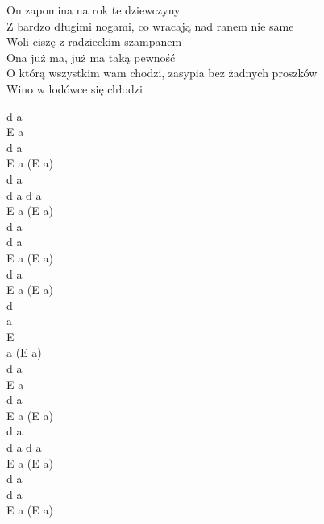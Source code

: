 \documentclass[a5paper, 10pt]{book}
\begin{document}
\begin{minipage}[t]{0.85\textwidth}
\hspace*{1mm} On zapomina na rok te dziewczyny\\
\hspace*{1mm} Z bardzo długimi nogami, co wracają nad ranem nie same\\
\hspace*{1mm} Woli ciszę z radzieckim szampanem\\

\hspace*{1mm} Ona już ma, już ma taką pewność\\
\hspace*{1mm} O którą wszystkim wam chodzi, zasypia bez żadnych proszków\\
\hspace*{1mm} Wino w lodówce się chłodzi\\

\end{minipage}
\begin{minipage}[t]{0.15\textwidth}
d a\\
E a\\
d a\\
E a (E a)\\

d a\\
d a d a\\
E a (E a)\\

d a\\
d a\\
E a (E a)\\

d a\\
E a (E a)\\
d\\
a\\
E\\
a (E a) \\

d a\\
E a\\
d a\\
E a (E a)\\

d a\\
d a d a\\
E a (E a)\\

d a\\
d a\\
E a (E a)\\

\end{minipage}
\end{document}
